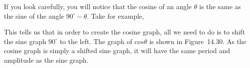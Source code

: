         
        \label{m39414*id87173}If you look carefully, you will notice that the cosine of an angle \begin{math}\theta \end{math} is the same as the sine of the angle \begin{math}{90}^{\circ }-\theta \end{math}. Take for example,\par 
        \label{m39414*id87206}\nopagebreak\noindent{}
    
        
        \label{m39414*id87280}This tells us that in order to create the cosine graph, all we need to do is to shift the sine graph \begin{math}{90}^{\circ }\end{math} to the left. The graph of \begin{math}cos\theta \end{math} is shown in Figure~14.30. As the cosine graph is simply a shifted sine graph, it will have the same period and amplitude as the sine graph.\par 
        
